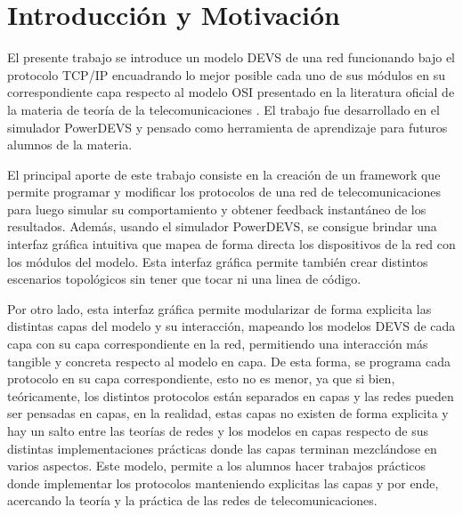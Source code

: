 \documentclass[10pt,a4paper]{article}
\begin{document}

\fecha{\today}



\maketitle

\tableofcontents
\newpage

\section{Introducción y Motivación}

El presente trabajo se introduce un modelo DEVS de una red funcionando bajo el protocolo TCP/IP encuadrando lo mejor posible cada uno de sus módulos en su correspondiente capa respecto al modelo OSI presentado en la literatura oficial de la materia de teoría de la telecomunicaciones \cite{peterson2007computer}. El trabajo fue desarrollado en el simulador PowerDEVS y pensado como herramienta de aprendizaje para futuros alumnos de la materia.

El principal aporte de este trabajo consiste en la creación de un framework que permite programar y modificar los protocolos de una red de telecomunicaciones para luego simular su comportamiento y obtener feedback instantáneo de los resultados. Además, usando el simulador PowerDEVS, se consigue brindar una interfaz gráfica intuitiva que mapea de forma directa los dispositivos de la red con los módulos del modelo. Esta interfaz gráfica permite también crear distintos escenarios topológicos sin tener que tocar ni una linea de código. 

Por otro lado, esta interfaz gráfica permite modularizar de forma explicita las distintas capas del modelo y su interacción, mapeando los modelos DEVS de cada capa con su capa correspondiente en la red, permitiendo una interacción más tangible y concreta respecto al modelo en capa. De esta forma, se programa cada protocolo en su capa correspondiente, esto no es menor, ya que si bien, teóricamente, los distintos protocolos están separados en capas y las redes pueden ser pensadas en capas, en la realidad, estas capas no existen de forma explicita y hay un salto entre las teorías de redes y los modelos en capas respecto de sus distintas implementaciones prácticas donde las capas terminan mezclándose en varios aspectos. Este modelo, permite a los alumnos hacer trabajos prácticos donde implementar los protocolos manteniendo explicitas las capas y por ende, acercando la teoría y la práctica de las redes de telecomunicaciones.
\end{document}
